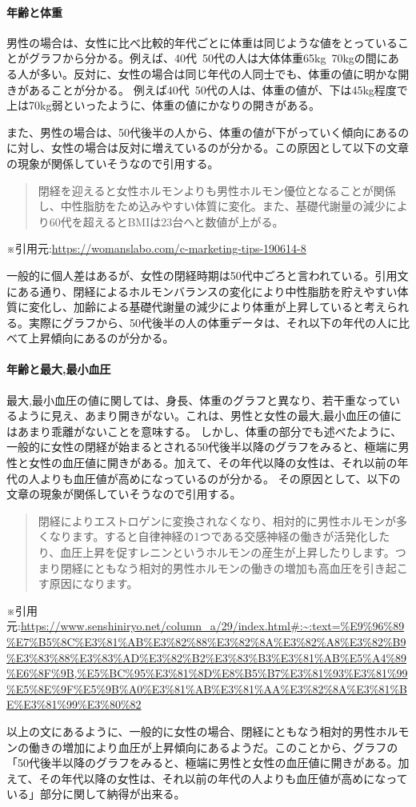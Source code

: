 \documentclass[dvipdfmx]{jsarticle}
\begin{document}
    \paragraph{年齢と体重}
    男性の場合は、女性に比べ比較的年代ごとに体重は同じような値をとっていることがグラフから分かる。例えば、40代~50代の人は大体体重65kg~70kgの間にある人が多い。反対に、女性の場合は同じ年代の人同士でも、体重の値に明かな開きがあることが分かる。
    例えば40代~50代の人は、体重の値が、下は45kg程度で上は70kg弱といったように、体重の値にかなりの開きがある。\par 
    また、男性の場合は、50代後半の人から、体重の値が下がっていく傾向にあるのに対し、女性の場合は反対に増えているのが分かる。この原因として以下の文章の現象が関係していそうなので引用する。
    \begin{quote}
        閉経を迎えると女性ホルモンよりも男性ホルモン優位となることが関係し、中性脂肪をため込みやすい体質に変化。また、基礎代謝量の減少により60代を超えるとBMIは23台へと数値が上がる。
    \end{quote}
    ※引用元:\url{https://womanslabo.com/c-marketing-tips-190614-8} \par 
    一般的に個人差はあるが、女性の閉経時期は50代中ごろと言われている。引用文にある通り、閉経によるホルモンバランスの変化により中性脂肪を貯えやすい体質に変化し、加齢による基礎代謝量の減少により体重が上昇していると考えられる。実際にグラフから、50代後半の人の体重データは、それ以下の年代の人に比べて上昇傾向にあるのが分かる。
    \paragraph{年齢と最大,最小血圧}
    最大,最小血圧の値に関しては、身長、体重のグラフと異なり、若干重なっているように見え、あまり開きがない。これは、男性と女性の最大,最小血圧の値にはあまり乖離がないことを意味する。
    しかし、体重の部分でも述べたように、一般的に女性の閉経が始まるとされる50代後半以降のグラフをみると、極端に男性と女性の血圧値に開きがある。加えて、その年代以降の女性は、それ以前の年代の人よりも血圧値が高めになっているのが分かる。
    その原因として、以下の文章の現象が関係していそうなので引用する。
    \begin{quote}
        閉経によりエストロゲンに変換されなくなり、相対的に男性ホルモンが多くなります。すると自律神経の1つである交感神経の働きが活発化したり、血圧上昇を促すレニンというホルモンの産生が上昇したりします。つまり閉経にともなう相対的男性ホルモンの働きの増加も高血圧を引き起こす原因になります。
    \end{quote}
    ※引用元:\url{https://www.senshiniryo.net/column_a/29/index.html#:~:text=%E9%96%89%E7%B5%8C%E3%81%AB%E3%82%88%E3%82%8A%E3%82%A8%E3%82%B9%E3%83%88%E3%83%AD%E3%82%B2%E3%83%B3%E3%81%AB%E5%A4%89%E6%8F%9B,%E5%BC%95%E3%81%8D%E8%B5%B7%E3%81%93%E3%81%99%E5%8E%9F%E5%9B%A0%E3%81%AB%E3%81%AA%E3%82%8A%E3%81%BE%E3%81%99%E3%80%82} \par
    以上の文にあるように、一般的に女性の場合、閉経にともなう相対的男性ホルモンの働きの増加により血圧が上昇傾向にあるようだ。このことから、グラフの「50代後半以降のグラフをみると、極端に男性と女性の血圧値に開きがある。加えて、その年代以降の女性は、それ以前の年代の人よりも血圧値が高めになっている」部分に関して納得が出来る。
\end{document}

